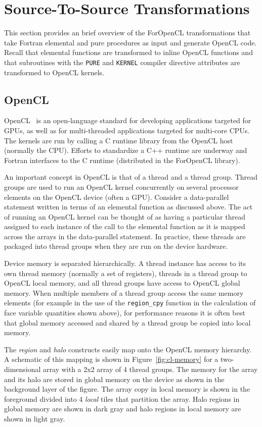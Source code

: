 \section{Source-To-Source Transformations}

This section provides an brief overview of the ForOpenCL transformations that take
Fortran elemental and pure procedures as input and generate OpenCL code.  Recall
that elemental functions are transformed to inline OpenCL functions and that
subroutines with the {\tt PURE} and {\tt KERNEL} compiler directive attributes
are transformed to OpenCL kernels.

\subsection{OpenCL}

OpenCL~\cite{opencl08} is an open-language standard for developing applications
targeted for GPUs, as well as for multi-threaded applications targeted for
multi-core CPUs.  The kernels are run by calling a C runtime library from the
OpenCL host (normally the CPU).  Efforts to standardize a C++ runtime are
underway and Fortran interfaces to the C runtime (distributed in the ForOpenCL
library).

An important concept in OpenCL is that of a thread and a thread group.  Thread
groups are used to run an OpenCL kernel concurrently on several processor
elements on the OpenCL device (often a GPU).  Consider a data-parallel statement
written in terms of an elemental function as discussed above.  The act of
running an OpenCL kernel can be thought of as having a particular thread
assigned to each instance of the call to the elemental function as it is mapped
across the arrays in the data-parallel statement.  In practice, these threads
are packaged into thread groups when they are run on the device hardware.

Device memory is separated hierarchically.  A thread instance has access to its
own thread memory (normally a set of registers), threads in a thread group to
OpenCL local memory, and all thread groups have access to OpenCL global memory.
When multiple members of a thread group access the same memory elements (for
example in the use of the {\tt region\_cpy} function in the calculation of face
variable quantities shown above), for performance reasons it is often best that
global memory accessed and shared by a thread group be copied into local memory.

The \emph{region} and \emph{halo} constructs easily map onto the OpenCL memory
hierarchy.  A schematic of this mapping is shown in Figure~\ref{fig:cl-memory}
for a two-dimensional array with a 2x2 array of 4 thread groups.  The memory
for the array and its halo are stored in global memory on the device as shown
in the background layer of the figure.  The array copy in local memory is
shown in the foreground divided into 4 \emph{local} tiles that partition the
array.  Halo regions in global memory are shown in dark gray and halo regions
in local memory are shown in light gray.

